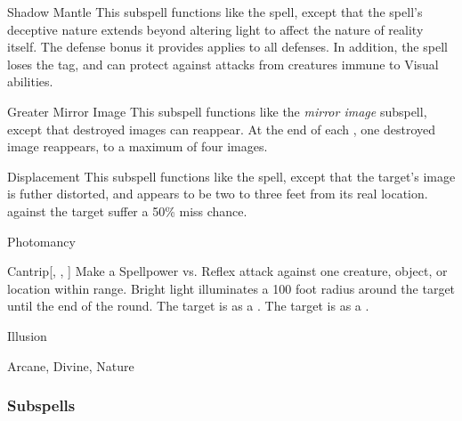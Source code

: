 \begin{ability}[\nth{4}]{Shadow Mantle}
This subspell functions like the  spell, except that the spell's deceptive nature extends beyond altering light to affect the nature of reality itself.
The defense bonus it provides applies to all defenses.
In addition, the spell loses the  tag, and can protect against attacks from creatures immune to Visual abilities.
\end{ability}
\vspace{0.25em}


\begin{ability}[\nth{5}]{Greater Mirror Image}
This subspell functions like the \textit{mirror image} subspell, except that destroyed images can reappear.
At the end of each , one destroyed image reappears, to a maximum of four images.
\end{ability}
\vspace{0.25em}


\begin{ability}[\nth{7}]{Displacement}
This subspell functions like the  spell, except that the target's image is futher distorted, and appears to be two to three feet from its real location.
  against the target suffer a 50\% miss chance.
\end{ability}
\vspace{0.25em}

\newpage
\begin{spellsection}{Photomancy}


\begin{ability}{Cantrip}[, , ]
Make a Spellpower vs. Reflex attack against one creature, object, or location within \rngmed range.
Bright light illuminates a 100 foot radius around the target until the end of the round.
\hit The target is \dazzled as a .
\crit The target is \blinded as a .
\end{ability}




 Illusion

 Arcane, Divine, Nature
\end{spellsection}


\subsubsection{Subspells}


